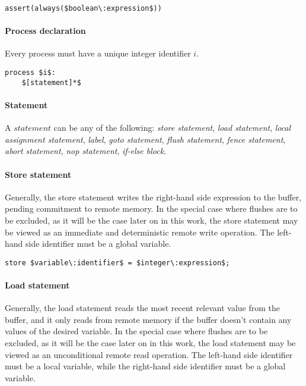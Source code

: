 \begin{lstlisting}[frame=single, mathescape]
assert(always($boolean\:expression$))
\end{lstlisting}

\paragraph{Process declaration}

Every process must have a unique integer identifier $i$.

\begin{lstlisting}[frame=single, mathescape]
process $i$:
	$[statement]*$
\end{lstlisting}

\paragraph{Statement}
A $statement$ can be any of the following: \emph{store statement}, \emph{load statement}, \emph{local assignment statement}, \emph{label}, \emph{goto statement}, \emph{flush statement}, \emph{fence statement}, \emph{abort statement}, \emph{nop statement}, \emph{if-else block}.

\paragraph{Store statement}
Generally, the store statement writes the right-hand side expression to the buffer, pending commitment to remote memory. In the special case where flushes are to be excluded, as it will be the case later on in this work, the store statement may be viewed as an immediate and deterministic remote write operation. The left-hand side identifier must be a global variable.

\begin{lstlisting}[frame=single, mathescape]
store $variable\:identifier$ = $integer\:expression$;
\end{lstlisting}

\paragraph{Load statement}
Generally, the load statement reads the most recent relevant value from the buffer, and it only reads from remote memory if the buffer doesn't contain any values of the desired variable. In the special case where flushes are to be excluded, as it will be the case later on in this work, the load statement may be viewed as an unconditional remote read operation. The left-hand side identifier must be a local variable, while the right-hand side identifier must be a global variable.

